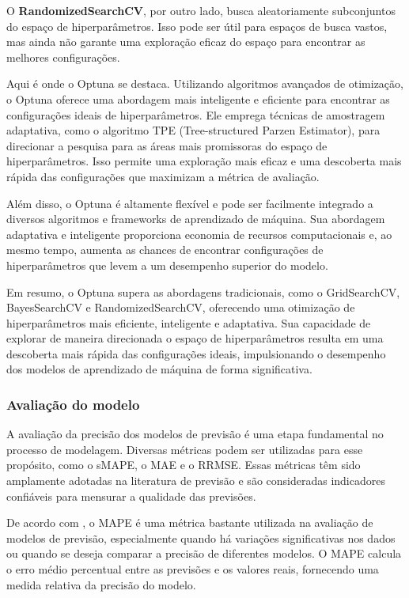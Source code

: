 O \textbf{RandomizedSearchCV}, por outro lado, busca aleatoriamente subconjuntos do espaço de hiperparâmetros. Isso pode ser útil para espaços de busca vastos, mas ainda não garante uma exploração eficaz do espaço para encontrar as melhores configurações.

Aqui é onde o Optuna se destaca. Utilizando algoritmos avançados de otimização, o Optuna oferece uma abordagem mais inteligente e eficiente para encontrar as configurações ideais de hiperparâmetros. Ele emprega técnicas de amostragem adaptativa, como o algoritmo TPE (Tree-structured Parzen Estimator), para direcionar a pesquisa para as áreas mais promissoras do espaço de hiperparâmetros. Isso permite uma exploração mais eficaz e uma descoberta mais rápida das configurações que maximizam a métrica de avaliação.

Além disso, o Optuna é altamente flexível e pode ser facilmente integrado a diversos algoritmos e frameworks de aprendizado de máquina. Sua abordagem adaptativa e inteligente proporciona economia de recursos computacionais e, ao mesmo tempo, aumenta as chances de encontrar configurações de hiperparâmetros que levem a um desempenho superior do modelo.

Em resumo, o Optuna supera as abordagens tradicionais, como o GridSearchCV, BayesSearchCV e RandomizedSearchCV, oferecendo uma otimização de hiperparâmetros mais eficiente, inteligente e adaptativa. Sua capacidade de explorar de maneira direcionada o espaço de hiperparâmetros resulta em uma descoberta mais rápida das configurações ideais, impulsionando o desempenho dos modelos de aprendizado de máquina de forma significativa.

\subsubsection{Avalia\c c\~ao do modelo}


A avaliação da precisão dos modelos de previsão é uma etapa fundamental no processo de modelagem. Diversas métricas podem ser utilizadas para esse propósito, como o sMAPE, o MAE e o RRMSE. Essas métricas têm sido amplamente adotadas na literatura de previsão e são consideradas indicadores confiáveis para mensurar a qualidade das previsões.

De acordo com , o MAPE é uma métrica bastante utilizada na avaliação de modelos de previsão, especialmente quando há variações significativas nos dados ou quando se deseja comparar a precisão de diferentes modelos. O MAPE calcula o erro médio percentual entre as previsões e os valores reais, fornecendo uma medida relativa da precisão do modelo.

